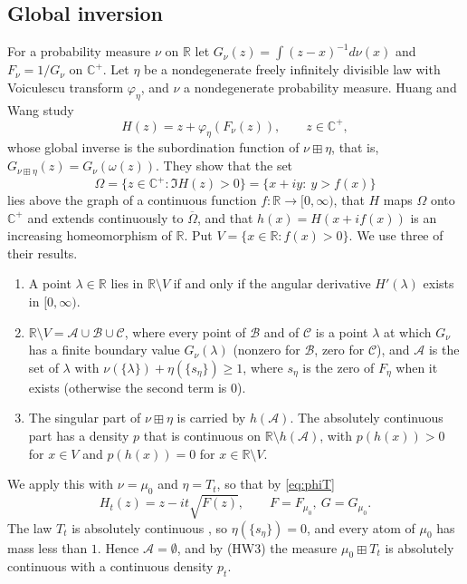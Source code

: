 \documentclass[11pt]{amsart}
\theoremstyle{definition}
\theoremstyle{remark}
\numberwithin{equation}{section}
\newcommand{\R}{\mathbb{R}}
\newcommand{\Hp}{\mathbb{C}^+}
\newcommand{\bp}{\boxplus}
\begin{document}
\subsection{Global inversion}
For a probability measure $\nu$ on $\R$ let $G_\nu(z)=\int(z-x)^{-1}d\nu(x)$ and $F_\nu=1/G_\nu$ on $\Hp$. Let $\eta$ be a nondegenerate freely infinitely divisible law with Voiculescu transform $\varphi_\eta$, and $\nu$ a nondegenerate probability measure. Huang and Wang \cite{HW} study
\[
H(z)=z+\varphi_\eta(F_\nu(z)),\qquad z\in\Hp,
\]
whose global inverse is the subordination function of $\nu\bp\eta$, that is, $G_{\nu\bp\eta}(z)=G_\nu(\omega(z))$. They show \cite[Section~3]{HW} that the set
\[
\Omega=\{z\in\Hp:\Im H(z)>0\}=\{x+iy:\ y>f(x)\}
\]
lies above the graph of a continuous function $f\colon\R\to[0,\infty)$, that $H$ maps $\Omega$ onto $\Hp$ and extends continuously to $\overline\Omega$, and that $h(x)=H(x+if(x))$ is an increasing homeomorphism of $\R$. Put $V=\{x\in\R: f(x)>0\}$. We use three of their results.

\begin{enumerate}[label=(HW\arabic*)]
\item \cite[Proposition~3.2]{HW} A point $\lambda\in\R$ lies in $\R\setminus V$ if and only if the angular derivative $H'(\lambda)$ exists in $[0,\infty)$.
\item \cite[Theorem~3.6 and Remark~3.7]{HW} $\R\setminus V=\mathcal A\cup\mathcal B\cup\mathcal C$, where every point of $\mathcal B$ and of $\mathcal C$ is a point $\lambda$ at which $G_\nu$ has a finite boundary value $G_\nu(\lambda)$ (nonzero for $\mathcal B$, zero for $\mathcal C$), and $\mathcal A$ is the set of $\lambda$ with $\nu(\{\lambda\})+\eta(\{s_\eta\})\ge1$, where $s_\eta$ is the zero of $F_\eta$ when it exists (otherwise the second term is $0$).
\item \cite[Theorem~3.9 and Example~3.8]{HW} The singular part of $\nu\bp\eta$ is carried by $h(\mathcal A)$. The absolutely continuous part has a density $p$ that is continuous on $\R\setminus h(\mathcal A)$, with $p(h(x))>0$ for $x\in V$ and $p(h(x))=0$ for $x\in\R\setminus V$.
\end{enumerate}

We apply this with $\nu=\mu_0$ and $\eta=T_t$, so that by \eqref{eq:phiT}
\begin{equation}\label{eq:H}
H_t(z)=z-it\sqrt{F(z)},\qquad F=F_{\mu_0},\ G=G_{\mu_0}.
\end{equation}
The law $T_t$ is absolutely continuous \cite{HK14}, so $\eta(\{s_\eta\})=0$, and every atom of $\mu_0$ has mass less than $1$. Hence $\mathcal A=\emptyset$, and by (HW3) the measure $\mu_0\bp T_t$ is absolutely continuous with a continuous density $p_t$.
\end{document}
